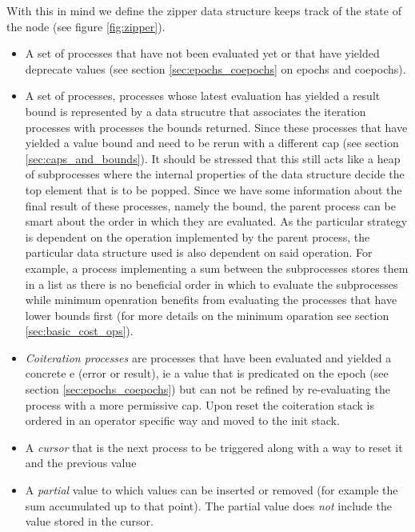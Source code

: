 With this in mind we define the zipper data structure keeps track of
the state of the node (see figure \ref{fig:zipper}).

\begin{itemize}
\item A set of  processes that have not been evaluated
  yet or that have yielded deprecate values (see section
  \ref{sec:epochs_coepochs} on epochs and coepochs).
\item A set of  processes, processes whose latest
  evaluation has yielded a result bound is represented by a data
  strucutre that associates the iteration processes with
   processes the bounds returned. Since these processes
  that have yielded a value bound and need to be rerun with a
  different cap (see section \ref{sec:caps_and_bounds}). It should be
  stressed that this still acts like a heap of subprocesses where the
  internal properties of the data structure decide the top element
  that is to be popped. Since we have some information about the final
  result of these processes, namely the bound, the parent process can
  be smart about the order in which they are evaluated. As the
  particular strategy is dependent on the operation implemented by the
  parent process, the particular data structure used is also dependent
  on said operation. For example, a process implementing a sum between
  the subprocesses stores them in a list as there is no beneficial
  order in which to evaluate the subprocesses while minimum openration
  benefits from evaluating the processes that have lower bounds first
  (for more details on the minimum oparation see section
  \ref{sec:basic_cost_ops}).

\item \emph{Coiteration processes} are processes that have been
  evaluated and yielded a concrete e (error or result), ie a value
  that is predicated on the epoch (see section
  \ref{sec:epochs_coepochs}) but can not be refined by re-evaluating
  the process with a more permissive cap. Upon reset the coiteration
  stack is ordered in an operator specific way and moved to the init
  stack.
\item A \emph{cursor} that is the next process to be triggered along
  with a way to reset it and the previous value
\item A \emph{partial} value to which values can be inserted or
  removed (for example the sum accumulated up to that point). The
  partial value does \emph{not} include the value stored in the
  cursor.
\end{itemize}

